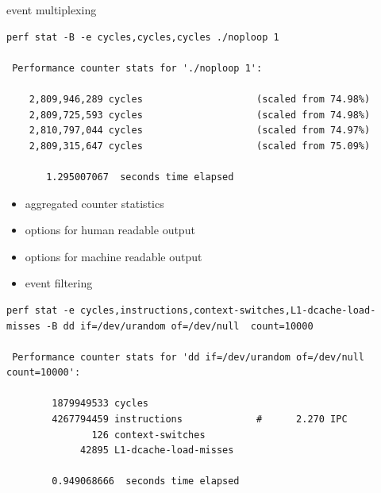 \begin{frame}[fragile]{event multiplexing}
\begin{itemize}
\end{itemize}
\pause
\begin{lstlisting}[basicstyle=\tiny\ttfamily]
perf stat -B -e cycles,cycles,cycles ./noploop 1

 Performance counter stats for './noploop 1':

    2,809,946,289 cycles                    (scaled from 74.98%)
    2,809,725,593 cycles                    (scaled from 74.98%)
    2,810,797,044 cycles                    (scaled from 74.97%)
    2,809,315,647 cycles                    (scaled from 75.09%)

       1.295007067  seconds time elapsed
\end{lstlisting}
\end{frame}

\begin{frame}[fragile]{}
\begin{itemize}
  \item aggregated counter statistics
  \item options for human readable output
  \item options for machine readable output
  \item event filtering
\end{itemize}
\pause
\begin{lstlisting}[basicstyle=\tiny\ttfamily]
perf stat -e cycles,instructions,context-switches,L1-dcache-load-misses -B dd if=/dev/urandom of=/dev/null  count=10000

 Performance counter stats for 'dd if=/dev/urandom of=/dev/null count=10000':

        1879949533 cycles                  
        4267794459 instructions             #      2.270 IPC  
               126 context-switches        
             42895 L1-dcache-load-misses   

        0.949068666  seconds time elapsed
\end{lstlisting}
\end{frame}

